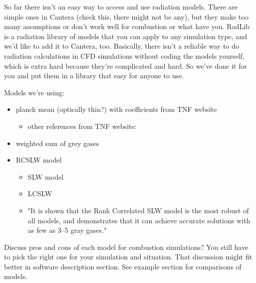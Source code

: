 \documentclass[preprint,12pt, a4paper]{elsarticle}
\begin{document}
So far there isn't an easy way to access and use radiation models. There are simple ones in Cantera (check this, there might not be any), but they make too many assumptions or don't work well for combustion or what have you. RadLib is a radiation library of models that you can apply to any simulation type, and we'd like to add it to Cantera, too. Basically, there isn't a reliable way to do radiation calculations in CFD simulations without coding the models yourself, which is extra hard because they're complicated and hard. So we've done it for you and put them in a library that easy for anyone to use.

Models we're using:
\begin{itemize}
	\item planck mean (optically thin?) with coefficients from TNF website \cite{Smith_2003}
	\begin{itemize}
		\item other references from TNF website: \cite{Grosshandler_1993,Frank_2000,Zhu_2002,Barlow_2001}
	\end{itemize}
	\item weighted sum of grey gases \cite{Bordbar_2014,Bordbar_2020}
	\item RCSLW model \cite{Solovjov_2017}
	\begin{itemize}
		\item SLW model \cite{Solovjov_2001}
		\item LCSLW \cite{Solovjov_2020}
		\item "It is shown that the Rank Correlated SLW model is the most robust of all models, and demonstrates that it can achieve accurate solutions with as few as 3–5 gray gases." \cite{Badger_2019}

	\end{itemize}		
\end{itemize}
Discuss pros and cons of each model for combustion simulations? You still have to pick the right one for your simulation and situation. That discussion might fit better in software description section. See example section for comparisons of models. 

\end{document}
